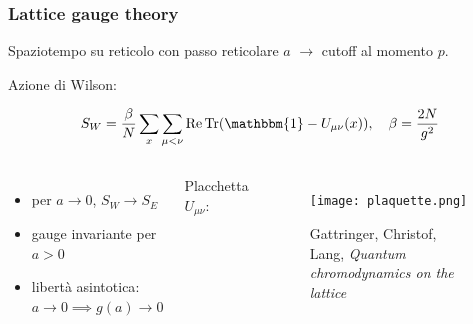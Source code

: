\documentclass{beamer}
\newcommand{\id}{\mathbbm{1}}
\begin{document}
\begin{frame}
	\frametitle{Lattice gauge theory}

	Spaziotempo su reticolo con \alert{passo reticolare $a$} $\rightarrow$ cutoff al momento $p$.

	\alert{Azione di Wilson}:

	\begin{equation*}
		S_W = \frac{\beta}{N} \sum_x \sum_{\mu<\nu} \Re \Tr(\id - U_{\mu\nu}(x)) \qc \beta = \frac{2N}{g^2}
	\end{equation*}

	\begin{columns}
			\begin{itemize}
				\item per $a \rightarrow 0$, $S_W \rightarrow S_E$
				\item \alert{gauge invariante} per $a > 0$
				\item \alert{libertà asintotica}: $a \rightarrow 0 \implies g(a) \rightarrow 0$
			\end{itemize}

			Placchetta $U_{\mu\nu}$:

			\begin{figure}[h]
				\centering
				\texttt{[image: plaquette.png]}
				\caption{Gattringer, Christof, Lang, \textit{Quantum chromodynamics on the lattice}}
			\end{figure}
			
	\end{columns}
\end{frame}
\end{document}

